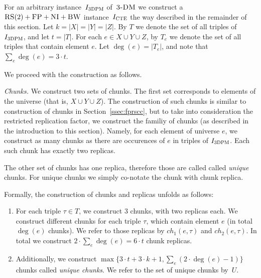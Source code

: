 For an arbitrary instance~$I_{\mathrm{\textsc{3DPM}}}$ of~$\textsc{3-DM}$ we construct a~$\textsc{RS}(2)+\textsc{FP}+\textsc{NI}+\textsc{BW}$ instance~$I_{\mathrm{\textsc{CTE}}}$ the way described in the remainder of this section.
Let $k = |X|=|Y|=|Z|$.
By $T$ we denote the set of all triples of $I_{\mathrm{\textsc{3DPM}}}$, and let $t = |T|$.
For each $e\in X\cup Y\cup Z$, by $T_e$ we denote the set of all triples that contain element $e$.
Let $\deg(e) = |T_e|$, and note that $\sum_e \deg(e) = 3\cdot t$.

We proceed with the construction as follows.

\emph{Chunks.}
We construct two sets of chunks.
The first set corresponds to elements of the universe (that is, $X\cup Y\cup Z$).
The construction of such chunks is similar to construction of chunks in Section~\ref{ssec:fprscc}, but to take into consideration the restricted replication factor, we construct the familiy of chunks (as described in the introduction to this section).
Namely, for each element of universe $e$, we construct as many chunks as there are occurences of $e$ in triples of $I_{\mathrm{\textsc{3DPM}}}$.
Each such chunk has exactly two replicas.

The other set of chunks has one replica, therefore those are called called \emph{unique} chunks.
For unique chunks we simply co-notate the chunk with chunk replica.

Formally, the construction of chunks and replicas unfolds as follows:
\begin{enumerate}
  \item For each triple $\tau \in T$, we construct $3$ chunks, with two replicas each.
  We construct different chunks for each triple $\tau$, which contain element $e$ (in total $\deg(e)$ chunks).
  We refer to those replicas by $ch_1(e, \tau)$ and $ch_2(e, \tau)$.
  In total we construct $2\cdot \sum_e\deg(e) = 6\cdot t$ chunk replicas.
  \item Additionally, we construct
$\max\{3\cdot t + 3\cdot k + 1, \sum_e(2\cdot \deg(e)-1)\}$
chunks called \emph{unique chunks}. We
refer to the set of unique chunks by~$U$.
\end{enumerate}


